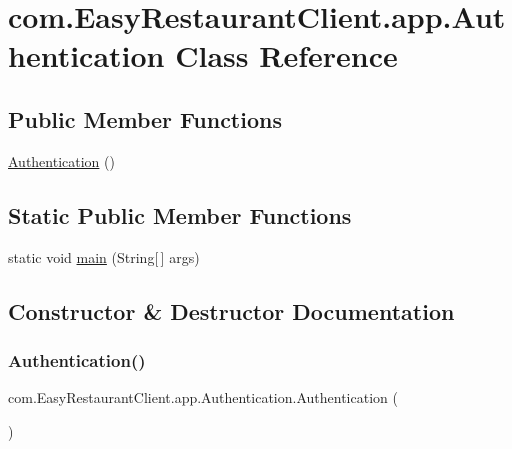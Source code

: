 \hypertarget{classcom_1_1_easy_restaurant_client_1_1app_1_1_authentication}{}\section{com.\+Easy\+Restaurant\+Client.\+app.\+Authentication Class Reference}
\label{classcom_1_1_easy_restaurant_client_1_1app_1_1_authentication}
\subsection*{Public Member Functions}
\begin{DoxyCompactItemize}
\item 
\mbox{\hyperlink{classcom_1_1_easy_restaurant_client_1_1app_1_1_authentication_a19bb6fd2fbc8754a258584f98a90a46e}{Authentication}} ()
\end{DoxyCompactItemize}
\subsection*{Static Public Member Functions}
\begin{DoxyCompactItemize}
\item 
static void \mbox{\hyperlink{classcom_1_1_easy_restaurant_client_1_1app_1_1_authentication_a37af68d54daa8e6c35126e42e9fc0cca}{main}} (String\mbox{[}$\,$\mbox{]} args)
\end{DoxyCompactItemize}


\subsection{Constructor \& Destructor Documentation}
\mbox{\label{classcom_1_1_easy_restaurant_client_1_1app_1_1_authentication_a19bb6fd2fbc8754a258584f98a90a46e}} 
\subsubsection{\texorpdfstring{Authentication()}{Authentication()}}
{\footnotesize\ttfamily com.\+Easy\+Restaurant\+Client.\+app.\+Authentication.\+Authentication (\begin{DoxyParamCaption}{ }\end{DoxyParamCaption})}



